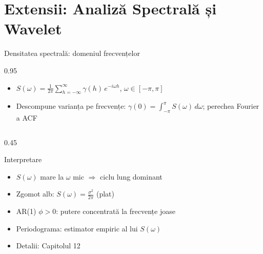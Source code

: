 \documentclass[9pt, aspectratio=169, t]{beamer}
\begin{document}
\section{Extensii: Analiză Spectrală și Wavelet}

\begin{frame}{Densitatea spectrală: domeniul frecvențelor}
    \begin{cminipage}{0.95\textwidth}
        \vspace{-0.2cm}
        {\footnotesize
        \begin{defn}
            \begin{itemize}\setlength{\itemsep}{0pt}
                \item $S(\omega) = \frac{1}{2\pi} \sum_{h=-\infty}^{\infty} \gamma(h)\, e^{-i\omega h}$, \quad $\omega \in [-\pi, \pi]$
                \item Descompune varianța pe frecvențe: $\gamma(0) = \int_{-\pi}^{\pi} S(\omega)\, d\omega$; perechea Fourier a ACF
            \end{itemize}
        \end{defn}
        }
        \vspace{-1mm}
        \begin{columns}[T]
            \begin{column}{0.45\textwidth}
                {\footnotesize
                \begin{block}{Interpretare}
                    \begin{itemize}\setlength{\itemsep}{0pt}
                        \item $S(\omega)$ mare la $\omega$ mic $\Rightarrow$ ciclu lung dominant
                        \item Zgomot alb: $S(\omega) = \frac{\sigma^2}{2\pi}$ (plat)
                        \item AR(1) $\phi > 0$: putere concentrată la frecvențe joase
                        \item Periodograma: estimator empiric al lui $S(\omega)$
                        \item \textcolor{MainBlue}{Detalii: Capitolul 12}
                    \end{itemize}
                \end{block}
                }

\end{column}
\end{columns}
\end{cminipage}
\end{frame}
\end{document}
